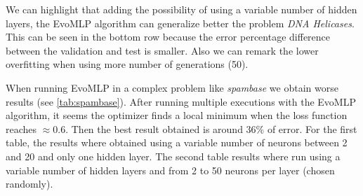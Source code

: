 \documentclass[conference]{IEEEtran}\usepackage[]{graphicx}\usepackage[]{color}
\begin{document}
We can highlight that adding the possibility of using a variable number of
hidden layers, the {\sf EvoMLP} algorithm can generalize better the problem
\emph{DNA Helicases}. This can be seen in the bottom row
because the error
percentage difference between the validation and test is smaller. Also we can
remark the lower overfitting when using more number of generations (50).



When running {\sf EvoMLP} in a complex problem like \emph{spambase} we obtain
worse results (see \autoref{tab:spambase}). After running multiple executions with the
{\sf EvoMLP} algorithm, it seems the optimizer finds a local minimum when the
loss function reaches $\approx0.6$. Then the best result obtained is around
$36\%$ of error. For the first table, the results where obtained using a
variable number of neurons between 2 and 20 and only one hidden layer. The
second table results where run using a variable number of hidden layers and
from 2 to 50 neurons per layer (chosen randomly).
\end{document}

